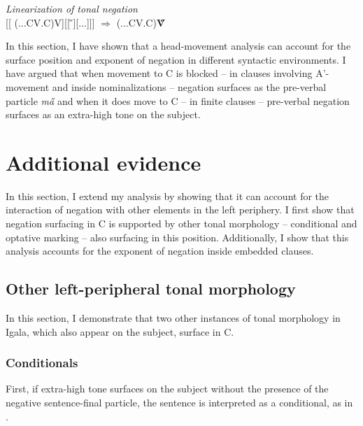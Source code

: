 \documentclass[output=paper,colorlinks,citecolor=brown,
]{langscibook}
\begin{document}
\ea \label{linneg}\textit{Linearization of tonal negation}\\
 {[[ (...CV.C)V][[ \H{}][...]]] $\Longrightarrow$ (...CV.C)\textbf{\H{V}}}
\z

In this section, I have shown that a head-movement analysis can account for the surface position and exponent of negation in different syntactic environments. I have argued that when movement to C is blocked -- in clauses involving A'-movement and inside nominalizations -- negation surfaces as the pre-verbal particle \textit{m\H{a}} and when it does move to C -- in finite clauses -- pre-verbal negation surfaces as an extra-high tone on the subject.


\section{Additional evidence}\label{ext}

In this section, I extend my analysis by showing that it can account for the interaction of negation with other elements in the left periphery. I first show that negation surfacing in C is supported by other tonal morphology -- conditional and optative marking -- also surfacing in this position. Additionally, I show that this analysis accounts for the exponent of negation inside embedded clauses.

\subsection{Other left-peripheral tonal morphology}

In this section, I demonstrate that two other instances of tonal morphology in Igala, which also appear on the subject, surface in C. 

\subsubsection{Conditionals}

First, if extra-high tone surfaces on the subject without the presence of the negative sentence-final particle, the sentence is interpreted as a conditional, as in .
\end{document}
